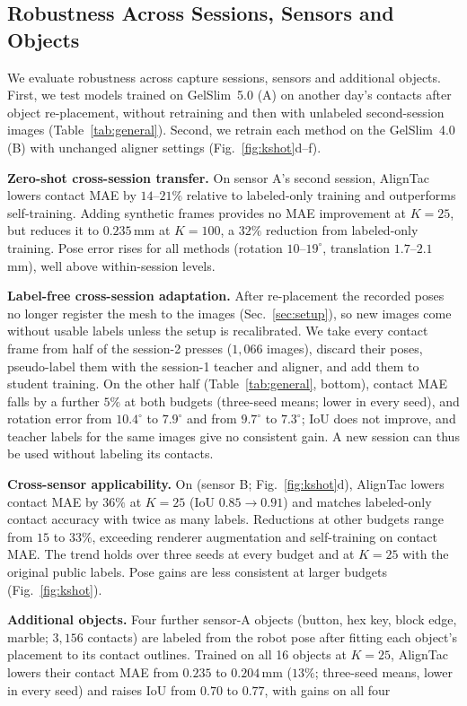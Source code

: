 \subsection{Robustness Across Sessions, Sensors and Objects}
\label{sec:general}
We evaluate robustness across capture sessions, sensors and additional objects. First, we test models trained on GelSlim~5.0 (A) on another day's contacts after object re-placement, without retraining and then with unlabeled second-session images (Table~\ref{tab:general}). Second, we retrain each method on the GelSlim~4.0 (B) with unchanged aligner settings (Fig.~\ref{fig:kshot}d--f).

\noindent\textbf{Zero-shot cross-session transfer.} On sensor A's second session, AlignTac lowers contact MAE by $14$--$21\%$ relative to labeled-only training and outperforms self-training. Adding synthetic frames provides no MAE improvement at $K=25$, but reduces it to $0.235\,$mm at $K=100$, a $32\%$ reduction from labeled-only training. Pose error rises for all methods (rotation $10$--$19^\circ$, translation $1.7$--$2.1\,$mm), well above within-session levels.

\noindent\textbf{Label-free cross-session adaptation.} After re-placement the recorded poses no longer register the mesh to the images (Sec.~\ref{sec:setup}), so new images come without usable labels unless the setup is recalibrated. We take every contact frame from half of the session-2 presses ($1{,}066$ images), discard their poses, pseudo-label them with the session-1 teacher and aligner, and add them to student training. On the other half (Table~\ref{tab:general}, bottom), contact MAE falls by a further $5\%$ at both budgets (three-seed means; lower in every seed), and rotation error from $10.4^\circ$ to $7.9^\circ$ and from $9.7^\circ$ to $7.3^\circ$; IoU does not improve, and teacher labels for the same images give no consistent gain. A new session can thus be used without labeling its contacts.

\noindent\textbf{Cross-sensor applicability.} On \sensorB{} (sensor B; Fig.~\ref{fig:kshot}d), AlignTac lowers contact MAE by $36\%$ at $K=25$ (IoU $0.85\to0.91$) and matches labeled-only contact accuracy with twice as many labels. Reductions at other budgets range from $15$ to $33\%$, exceeding renderer augmentation and self-training on contact MAE. The trend holds over three seeds at every budget and at $K=25$ with the original public labels. Pose gains are less consistent at larger budgets (Fig.~\ref{fig:kshot}).

\noindent\textbf{Additional objects.} Four further sensor-A objects (button, hex key, block edge, marble; $3{,}156$ contacts) are labeled from the robot pose after fitting each object's placement to its contact outlines. Trained on all 16 objects at $K=25$, AlignTac lowers their contact MAE from $0.235$ to $0.204\,$mm ($13\%$; three-seed means, lower in every seed) and raises IoU from $0.70$ to $0.77$, with gains on all four 

